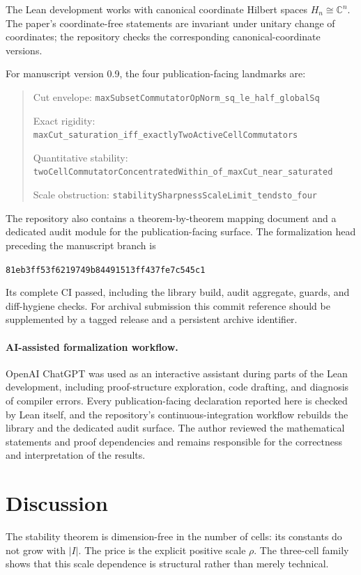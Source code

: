 \documentclass[11pt]{article}
\newcommand{\C}{\mathbb{C}}
\begin{document}
The Lean development works with canonical coordinate Hilbert spaces
$H_n\cong\C^n$.  The paper's coordinate-free statements are invariant under
unitary change of coordinates; the repository checks the corresponding
canonical-coordinate versions.

For manuscript version 0.9, the four publication-facing landmarks are:
\begin{quote}
\scriptsize
Cut envelope:\quad
\nolinkurl{maxSubsetCommutatorOpNorm_sq_le_half_globalSq}

Exact rigidity:\quad
\nolinkurl{maxCut_saturation_iff_exactlyTwoActiveCellCommutators}

Quantitative stability:\quad
\nolinkurl{twoCellCommutatorConcentratedWithin_of_maxCut_near_saturated}

Scale obstruction:\quad
\nolinkurl{stabilitySharpnessScaleLimit_tendsto_four}
\end{quote}
The repository also contains a theorem-by-theorem mapping document and a
dedicated audit module for the publication-facing surface.  The formalization
head preceding the manuscript branch is
\begin{center}
\small\texttt{81eb3ff53f6219749b84491513ff437fe7c545c1}
\end{center}
Its complete CI passed, including the library build, audit aggregate, guards,
and diff-hygiene checks.  For archival submission this commit reference should
be supplemented by a tagged release and a persistent archive identifier.

\paragraph{AI-assisted formalization workflow.}
OpenAI ChatGPT was used as an interactive assistant during parts of the Lean
development, including proof-structure exploration, code drafting, and
diagnosis of compiler errors.  Every publication-facing declaration reported
here is checked by Lean itself, and the repository's continuous-integration
workflow rebuilds the library and the dedicated audit surface.  The author
reviewed the mathematical statements and proof dependencies and remains
responsible for the correctness and interpretation of the results.

\section{Discussion}

The stability theorem is dimension-free in the number of cells: its constants
do not grow with $|I|$.  The price is the explicit positive scale $\rho$.
The three-cell family shows that this scale dependence is structural rather
than merely technical.
\end{document}
